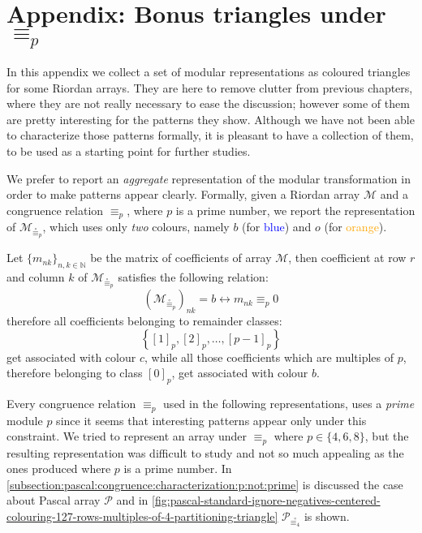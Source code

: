 
\chapter{Appendix: Bonus triangles under $\equiv_{p}$}

In this appendix we collect a set of modular representations as coloured
triangles for some Riordan arrays. They are here to remove clutter from
previous chapters, where they are not really necessary to ease the discussion;
however some of them are pretty interesting for the patterns they show.
Although we have not been able to characterize those patterns formally, it is
pleasant to have a collection of them, to be used as a starting point for
further studies.

We prefer to report an \emph{aggregate} representation of the modular
transformation in order to make patterns appear clearly. Formally, given a
Riordan array $\mathcal{M}$ and a congruence relation $\equiv_{p}$, where $p$
is a prime number, we report the representation of
$\mathcal{M}_{\stackrel{\circ}\equiv_{p}}$, which uses only \emph{two} colours,
namely $b$ (for \textcolor{blue}{blue}) and $o$ (for
\textcolor{orange}{orange}). 

Let $\lbrace m_{nk}\rbrace_{n,k\in\mathbb{N}}$ be the matrix of coefficients of
array $\mathcal{M}$, then coefficient at row $r$ and column $k$ of
$\mathcal{M}_{\stackrel{\circ}\equiv_{p}}$ satisfies the following relation:
\begin{displaymath}
    \left(\mathcal{M}_{\stackrel{\circ}\equiv_{p}}\right)_{nk} = b 
    \leftrightarrow m_{nk}\equiv_{p}  0
\end{displaymath}
therefore all coefficients belonging to remainder classes:
\begin{displaymath}
    \left\lbrace[1]_{p},[2]_{p},\ldots,[p-1]_{p}\right\rbrace
\end{displaymath}
get associated with colour $c$, while all those coefficients which are
multiples of $p$, therefore belonging to class $[0]_{p}$, get associated with
colour $b$.

Every congruence relation $\equiv_{p}$ used in the following representations,
uses a \emph{prime} module $p$ since it seems that interesting patterns appear
only under this constraint. We tried to represent an array under $\equiv_{p}$
where $p\in\lbrace4,6,8\rbrace$, but the resulting representation was difficult
to study and not so much appealing as the ones produced where $p$ is a prime
number. In \autoref{subsection:pascal:congruence:characterization:p:not:prime}
is discussed the case about Pascal array $\mathcal{P}$ and in
\autoref{fig:pascal-standard-ignore-negatives-centered-colouring-127-rows-multiples-of-4-partitioning-triangle}
$\mathcal{P}_{\stackrel{\circ}{\equiv_{4}}}$ is shown.

